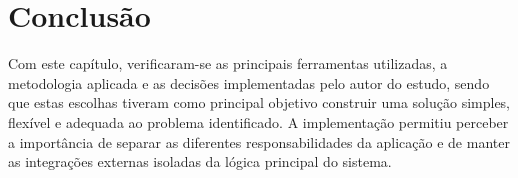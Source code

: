 \section{Conclusão}

	Com este capítulo, verificaram-se as principais ferramentas utilizadas, a metodologia aplicada e as decisões implementadas pelo autor do estudo, sendo que estas escolhas tiveram como principal objetivo construir uma solução simples, flexível e adequada ao problema identificado. A implementação permitiu perceber a importância de separar as diferentes responsabilidades da aplicação e de manter as integrações externas isoladas da lógica principal do sistema.
	